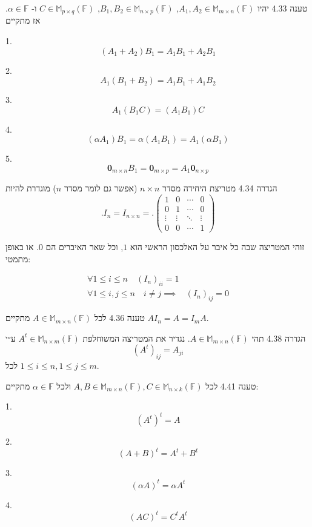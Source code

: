 \documentclass[a4paper, 11pt]{article}
\begin{document}
\begin{envbox}[thmcolor]{טענה 4.33}
יהיו $A_1,A_2\in\mathbb{M}_{m\times n}(\mathbb{F})$, $B_1,B_2\in\mathbb{M}_{n\times p}(\mathbb{F})$, $C\in\mathbb{M}_{p\times q}(\mathbb{F})$ ו- $\alpha\in\mathbb{F}$. אז מתקיים

1.  
\[
(A_1+A_2)B_1=A_1B_1+A_2B_1
\]

2.  
\[
A_1(B_1+B_2)=A_1B_1+A_1B_2
\]

3.  
\[
A_1(B_1C)=(A_1B_1)C
\]

4.  
\[
(\alpha A_1)B_1=\alpha(A_1B_1)=A_1(\alpha B_1)
\]

5.  
\[
\mathbf{0}_{m\times n} B_1=\mathbf{0}_{m\times p}=A_1\mathbf{0}_{n\times p}
\]
\end{envbox}

\begin{envbox}[defcolor]{הגדרה 4.34}
מטריצת היחידה מסדר $n\times n$ (אפשר גם לומר מסדר $n$) מוגדרת להיות 
\[
.I_n=I_{n\times n}=.
\begin{pmatrix}
1 &0 &\cdots &0\\
0 &1 &\cdots &0\\
\vdots &\vdots &\ddots &\vdots\\
0 &0 &\cdots &1
\end{pmatrix}
\]

זוהי המטריצה שבה כל איבר על האלכסון הראשי הוא $1$, וכל שאר האיברים הם $0$. או באופן מתמטי:

\[
\begin{aligned}
\forall 1\leq i\leq n \quad (I_n)_{ii}=1 \\
\forall 1\leq i,j\leq n  \quad i\neq j \implies &(I_n)_{ij}=0
\end{aligned}
\]
\end{envbox}

\begin{envbox}[thmcolor]{טענה 4.36}
לכל $A\in\mathbb{M}_{m\times n}(\mathbb{F})$ מתקיים $AI_n=A=I_m A$.
\end{envbox}

\begin{envbox}[defcolor]{הגדרה 4.38}
תהי $A\in\mathbb{M}_{m\times n}(\mathbb{F})$. נגדיר את המטריצה המשוחלפת $A^t\in\mathbb{M}_{n\times m}(\mathbb{F})$ ע״י 
\[
(A^t)_{ij}=A_{ji}
\]
 לכל $1\leq i\leq n,1\leq j\leq m$.
\end{envbox}

\begin{envbox}[thmcolor]{טענה 4.41}
לכל $A,B\in\mathbb{M}_{m\times n}(\mathbb{F}), C\in\mathbb{M}_{n\times k}(\mathbb{F})$ ולכל $\alpha\in\mathbb{F}$ מתקיים:

1.  
\[
(A^t)^t=A
\]

2.  
\[
(A+B)^t=A^t+B^t
\]

3.  
\[
(\alpha A)^t=\alpha A^t
\]

4.  
\[
(AC)^t=C^tA^t
\]
\end{envbox}
\end{document}
